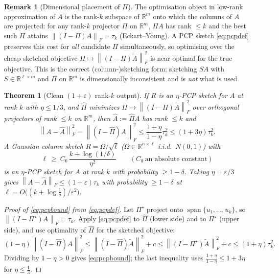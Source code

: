 \documentclass{amsart}
\newtheorem{theorem}{Theorem}
\theoremstyle{definition}
\newtheorem{remark}{Remark}
\DeclareMathOperator{\spann}{span}
\newcommand{\R}{\mathbb{R}}
\newcommand{\Frob}[1]{\left\lVert #1\right\rVert_F}
\newcommand{\Atil}{\widetilde{A}}
\begin{document}
\begin{remark}[Dimensional placement of $\Pi$]\label{rem:dims}
The optimisation object in low-rank approximation of $A$ is the rank-$k$
subspace of $\R^m$ onto which the columns of $A$ are projected: for any rank-$k$
projector $\Pi$ on $\R^m$, $\Pi A$ has rank $\le k$ and the best such $\Pi$
attains $\Frob{(I-\Pi)A}=\tau_k$ (Eckart--Young). A PCP sketch
\eqref{eq:pcpdef} preserves this cost for \emph{all} candidate $\Pi$
simultaneously, so optimising over the cheap sketched objective
$\Pi\mapsto\Frob{(I-\Pi)\Atil}^2$ is near-optimal for the true objective. This
is the correct (column-)sketching form; sketching $SA$ with $S\in\R^{\ell\times
m}$ and $\Pi$ on $\R^m$ is dimensionally inconsistent and is \emph{not} what is
used.
\end{remark}

\begin{theorem}[Clean $(1+\varepsilon)$ rank-$k$ output]\label{thm:pcp}
If $R$ is an $\eta$-PCP sketch for $A$ at rank $k$ with $\eta\le1/3$, and
$\widehat\Pi$ minimizes $\Pi\mapsto\Frob{(I-\Pi)\Atil}^2$ over orthogonal
projectors of rank $\le k$ on $\R^m$, then $\widehat A:=\widehat\Pi A$ has rank
$\le k$ and
\begin{equation}\label{eq:pcpbound}
\Frob{A-\widehat A}^2=\Frob{(I-\widehat\Pi)A}^2
\le\frac{1+\eta}{1-\eta}\tau_k^2\le(1+3\eta)\tau_k^2 .
\end{equation}
A Gaussian column sketch $R=\Omega/\sqrt\ell$ ($\Omega\in\R^{n\times\ell}$ i.i.d.\
$N(0,1)$) with
\[
\ell\ \ge\ C_0\,\frac{k+\log(1/\delta)}{\eta^2}\qquad(C_0\ \text{an absolute constant})
\]
is an $\eta$-PCP sketch for $A$ at rank $k$ with probability $\ge1-\delta$. Taking
$\eta=\varepsilon/3$ gives $\Frob{A-\widehat A}\le(1+\varepsilon)\tau_k$ with
probability $\ge1-\delta$ at $\ell=O\big((k+\log\tfrac1\delta)/\varepsilon^2\big)$.
\end{theorem}

\begin{proof}[Proof of \eqref{eq:pcpbound} from \eqref{eq:pcpdef}]
Let $\Pi^\star$ project onto $\spann\{u_1,\dots,u_k\}$, so
$\Frob{(I-\Pi^\star)A}=\tau_k$. Apply \eqref{eq:pcpdef} to $\widehat\Pi$ (lower
side) and to $\Pi^\star$ (upper side), and use optimality of $\widehat\Pi$ for
the sketched objective:
\[
(1-\eta)\Frob{(I-\widehat\Pi)A}^2\le\Frob{(I-\widehat\Pi)\Atil}^2+c
\le\Frob{(I-\Pi^\star)\Atil}^2+c\le(1+\eta)\tau_k^2 .
\]
Dividing by $1-\eta>0$ gives \eqref{eq:pcpbound}; the last inequality uses
$\frac{1+\eta}{1-\eta}\le1+3\eta$ for $\eta\le\tfrac13$.
\end{proof}
\end{document}
